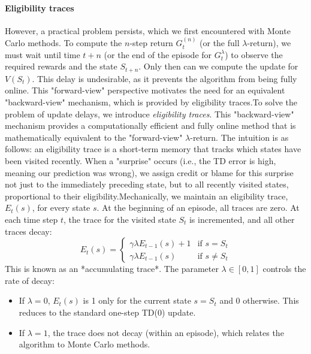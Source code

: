   \paragraph{Eligibility traces}
  However, a practical problem persists, which we first encountered with Monte Carlo methods. To compute the 
  $n$-step return $G_t^{(n)}$ (or the full $\lambda$-return), we must wait until time $t+n$ (or the end of the 
  episode for $G_t^\lambda$) to observe the required rewards and the state $S_{t+n}$. Only then can we compute 
  the update for $V(S_t)$. This delay is undesirable, as it prevents the algorithm from being fully online. 
  This "forward-view" perspective motivates the need for an equivalent "backward-view" mechanism, 
  which is provided by eligibility traces.\newline To solve the problem of update delays, we introduce
  \textit{eligibility traces}. This "backward-view" mechanism provides a computationally efficient and
  fully online method that is mathematically equivalent to the "forward-view" $\lambda$-return. The intuition is 
  as follows: an eligibility trace is a short-term memory that tracks which states have been visited recently.
  When a "surprise" occurs (i.e., the TD error is high, meaning our prediction was wrong), we assign credit or
  blame for this surprise not just to the immediately preceding state, but to all recently visited states, 
  proportional to their eligibility.\newline  Mechanically, we maintain an eligibility trace, $E_t(s)$, for every
  state $s$. At the beginning of an episode, all traces are zero. At each time step $t$, the trace for the visited
  state $S_t$ is incremented, and all other traces decay:
  $$
  E_t(s) =
  \begin{cases}
    \gamma \lambda E_{t-1}(s) + 1 & \text{if } s = S_t \\
    \gamma \lambda E_{t-1}(s)       & \text{if } s \neq S_t
  \end{cases}
  $$
  This is known as an *accumulating trace*. The parameter $\lambda \in [0, 1]$ controls the rate of decay:
  \begin{itemize}
    \item If $\lambda=0$, $E_t(s)$ is 1 only for the current state $s=S_t$ and 0 otherwise. This reduces to the standard one-step TD(0) update.
    \item If $\lambda=1$, the trace does not decay (within an episode), which relates the algorithm to Monte Carlo methods.
  \end{itemize}

